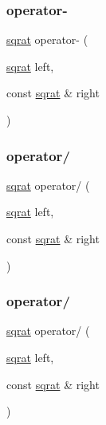 \mbox{\label{classsqrat_a78bb0ea9bd5a4282ba33a61c4bc073b6}} 
\subsubsection{\texorpdfstring{operator-\/}{operator-}\hspace{0.1cm}{\footnotesize\ttfamily [6/6]}}
{\footnotesize\ttfamily \mbox{\hyperlink{classsqrat}{sqrat}} operator-\/ (\begin{DoxyParamCaption}\item[{\mbox{\hyperlink{classsqrat}{sqrat}}}]{left,  }\item[{const \mbox{\hyperlink{classsqrat}{sqrat}} \&}]{right }\end{DoxyParamCaption})\hspace{0.3cm}{\ttfamily [friend]}}

\mbox{\label{classsqrat_aa6e76248a9ec776743e60e5db8b3cb6d}} 
\subsubsection{\texorpdfstring{operator/}{operator/}\hspace{0.1cm}{\footnotesize\ttfamily [1/3]}}
{\footnotesize\ttfamily \mbox{\hyperlink{classsqrat}{sqrat}} operator/ (\begin{DoxyParamCaption}\item[{\mbox{\hyperlink{classsqrat}{sqrat}}}]{left,  }\item[{const \mbox{\hyperlink{classsqrat}{sqrat}} \&}]{right }\end{DoxyParamCaption})\hspace{0.3cm}{\ttfamily [friend]}}

\mbox{\label{classsqrat_aa6e76248a9ec776743e60e5db8b3cb6d}} 
\subsubsection{\texorpdfstring{operator/}{operator/}\hspace{0.1cm}{\footnotesize\ttfamily [2/3]}}
{\footnotesize\ttfamily \mbox{\hyperlink{classsqrat}{sqrat}} operator/ (\begin{DoxyParamCaption}\item[{\mbox{\hyperlink{classsqrat}{sqrat}}}]{left,  }\item[{const \mbox{\hyperlink{classsqrat}{sqrat}} \&}]{right }\end{DoxyParamCaption})\hspace{0.3cm}{\ttfamily [friend]}}

